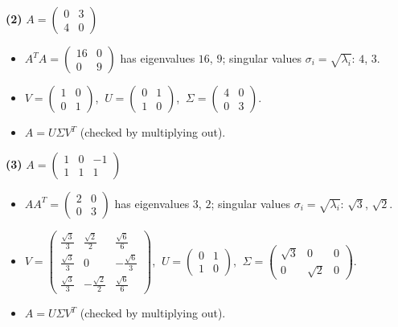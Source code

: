 \noindent\textbf{(2)} $A=\begin{pmatrix}0 & 3 \\ 4 & 0\end{pmatrix}$
\begin{itemize}\item $A^TA=\begin{pmatrix}16 & 0 \\ 0 & 9\end{pmatrix}$ has eigenvalues $16$, $9$; singular values $\sigma_i=\sqrt{\lambda_i}$: $4$, $3$.
\item $V=\begin{pmatrix}1 & 0 \\ 0 & 1\end{pmatrix}$, $\ U=\begin{pmatrix}0 & 1 \\ 1 & 0\end{pmatrix}$, $\ \Sigma=\begin{pmatrix}4 & 0 \\ 0 & 3\end{pmatrix}$.
\item $A=U\Sigma V^T$ (checked by multiplying out).\end{itemize}

\noindent\textbf{(3)} $A=\begin{pmatrix}1 & 0 & -1 \\ 1 & 1 & 1\end{pmatrix}$
\begin{itemize}\item $AA^T=\begin{pmatrix}2 & 0 \\ 0 & 3\end{pmatrix}$ has eigenvalues $3$, $2$; singular values $\sigma_i=\sqrt{\lambda_i}$: $\sqrt{3}$, $\sqrt{2}$.
\item $V=\begin{pmatrix}\frac{\sqrt{3}}{3} & \frac{\sqrt{2}}{2} & \frac{\sqrt{6}}{6} \\ \frac{\sqrt{3}}{3} & 0 & - \frac{\sqrt{6}}{3} \\ \frac{\sqrt{3}}{3} & - \frac{\sqrt{2}}{2} & \frac{\sqrt{6}}{6}\end{pmatrix}$, $\ U=\begin{pmatrix}0 & 1 \\ 1 & 0\end{pmatrix}$, $\ \Sigma=\begin{pmatrix}\sqrt{3} & 0 & 0 \\ 0 & \sqrt{2} & 0\end{pmatrix}$.
\item $A=U\Sigma V^T$ (checked by multiplying out).\end{itemize}

